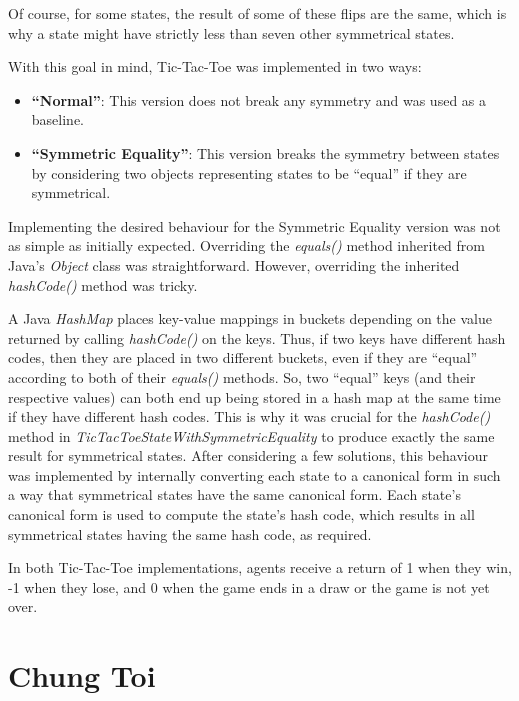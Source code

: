 \documentclass[11pt,a4paper]{report}
\begin{document}
Of course, for some states, the result of some of these flips are the same, which is why a state might have strictly less than seven other symmetrical states.

With this goal in mind, Tic-Tac-Toe was implemented in two ways:

\begin{itemize}

	\item \textbf{``Normal''}:
This version does not break any symmetry and was used as a baseline.

	\item \textbf{``Symmetric Equality''}: 
This version breaks the symmetry between states by considering two objects representing states to be ``equal'' if they are symmetrical.

\end{itemize}

Implementing the desired behaviour for the Symmetric Equality version was not as simple as initially expected. Overriding the \emph{equals()} method inherited from Java's \emph{Object} class was straightforward. However, overriding the inherited \emph{hashCode()} method was tricky.

A Java \emph{HashMap} places key-value mappings in buckets depending on the value returned by calling \emph{hashCode()} on the keys. Thus, if two keys have different hash codes, then they are placed in two different buckets, even if they are ``equal'' according to both of their \emph{equals()} methods. So, two ``equal'' keys (and their respective values) can both end up being stored in a hash map at the same time if they have different hash codes. This is why it was crucial for the \emph{hashCode()} method in \emph{TicTacToeStateWithSymmetricEquality} to produce exactly the same result for symmetrical states. After considering a few solutions, this behaviour was implemented by internally converting each state to a canonical form in such a way that symmetrical states have the same canonical form. Each state's canonical form is used to compute the state's hash code, which results in all symmetrical states having the same hash code, as required.

In both Tic-Tac-Toe implementations, agents receive a return of 1 when they win, -1 when they lose, and 0 when the game ends in a draw or the game is not yet over.


\section{Chung Toi}
\label{sec:ChungToi}
\end{document}
